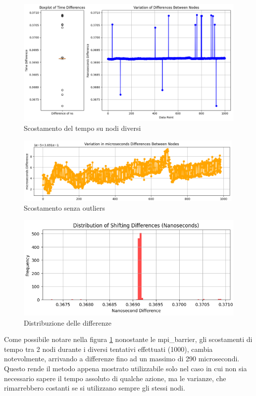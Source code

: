 \begin{figure}[H]
    \centering
    \includegraphics[width=\textwidth]{./results/time_sync_node.png}
    \caption{Scostamento del tempo su nodi diversi}
    \label{fig:sync_time_shift1}
\end{figure}
\begin{figure}[H]
    \includegraphics[width=0.99\textwidth]{./results/time_shift_clean.png}
    \caption{Scostamento senza outliers}
    \label{fig:sync_diff_distr2}
\end{figure}
\begin{figure}[H]
    \includegraphics[width=\textwidth]{./results/time_sync_distribution.png}
    \caption{Distribuzione delle differenze}
    \label{fig:sync_diff_distr3}
\end{figure}

Come possibile notare nella figura \ref{fig:sync_time_shift1} nonostante le mpi\_barrier, gli scostamenti di tempo tra 2 nodi durante i diversi tentativi effettuati (1000), cambia notevolmente, arrivando a differenze fino ad un massimo di 290 microsecondi. Questo rende il metodo appena mostrato utilizzabile solo nel caso in cui non sia necessario sapere il tempo assoluto di qualche azione, ma le varianze, che rimarrebbero costanti se si utilizzano sempre gli stessi nodi.


